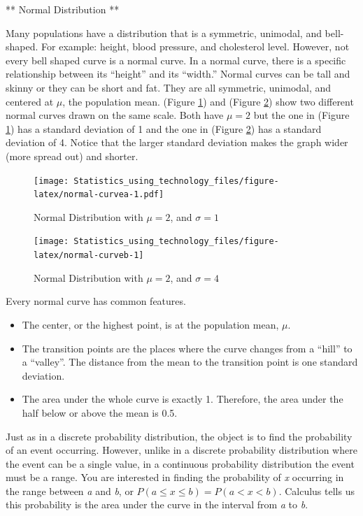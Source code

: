 \documentclass[
]{book}
\providecommand{\tightlist}{%
  \setlength{\itemsep}{0pt}\setlength{\parskip}{0pt}}
\begin{document}
** Normal Distribution **

Many populations have a distribution that is a symmetric, unimodal, and bell-shaped. For example: height, blood pressure, and cholesterol level. However, not every bell shaped curve is a normal curve. In a normal curve, there is a specific relationship between its ``height'' and its ``width.''
Normal curves can be tall and skinny or they can be short and fat. They are all symmetric, unimodal, and centered at \(\mu\), the population mean. (Figure \ref{fig:normal-curvea}) and (Figure \ref{fig:normal-curveb}) show two different normal curves drawn on the same scale. Both have \(\mu=2\) but the one in (Figure \ref{fig:normal-curvea}) has a standard deviation of 1 and the one in (Figure \ref{fig:normal-curveb}) has a standard deviation of 4. Notice that the larger standard deviation makes the graph wider (more spread out) and shorter.



\begin{figure}
\centering
\texttt{[image: Statistics\_using\_technology\_files/figure-latex/normal-curvea-1.pdf]}
\caption{\label{fig:normal-curvea}Normal Distribution with \(\mu=2\), and \(\sigma=1\)}
\end{figure}



\begin{figure}
\texttt{[image: Statistics\_using\_technology\_files/figure-latex/normal-curveb-1]} \caption{Normal Distribution with \(\mu = 2\), and \(\sigma = 4\)}\label{fig:normal-curveb}
\end{figure}

Every normal curve has common features.

\begin{itemize}
\tightlist
\item
  The center, or the highest point, is at the population mean, \(\mu\).
\item
  The transition points are the places where the curve changes from a ``hill'' to a ``valley''. The distance from the mean to the transition point is one standard deviation.
\item
  The area under the whole curve is exactly 1. Therefore, the area under the half below or above the mean is 0.5.
\end{itemize}

Just as in a discrete probability distribution, the object is to find the probability of an event occurring. However, unlike in a discrete probability distribution where the event can be a single value, in a continuous probability distribution the event must be a range. You are interested in finding the probability of \emph{x} occurring in the range between \emph{a} and \emph{b}, or \(P(a \le x \le b) = P(a<x<b)\). Calculus tells us this probability is the area under the curve in the interval from \emph{a} to \emph{b}.
\end{document}
